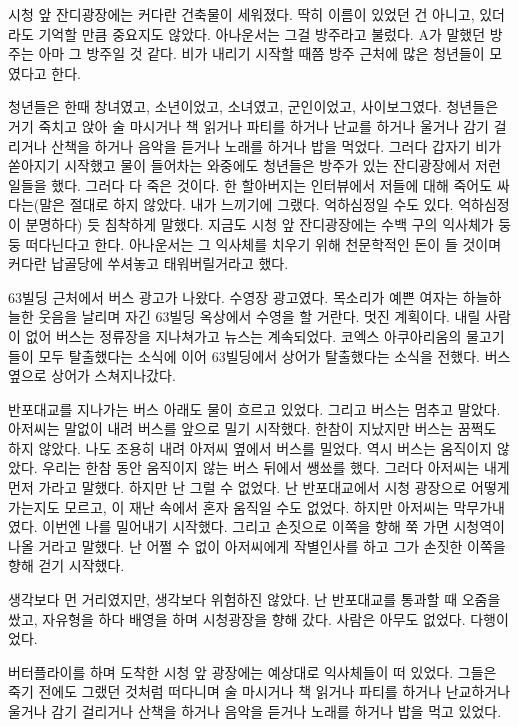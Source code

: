 \documentclass[a5paper,10pt, twoside, openright]{memoir}
\begin{document}
	시청 앞 잔디광장에는 커다란 건축물이 세워졌다. 딱히 이름이 있었던 건 아니고, 있더라도 기억할 만큼 중요지도 않았다. 아나운서는 그걸 방주라고 불렀다. A가 말했던 방주는 아마 그 방주일 것 같다. 비가 내리기 시작할 때쯤 방주 근처에 많은 청년들이 모였다고 한다. 
	
	청년들은 한때 창녀였고, 소년이었고, 소녀였고, 군인이었고, 사이보그였다. 청년들은 거기 죽치고 앉아 술 마시거나 책 읽거나 파티를 하거나 난교를 하거나 울거나 감기 걸리거나 산책을 하거나 음악을 듣거나 노래를 하거나 밥을 먹었다. 그러다 갑자기 비가 쏟아지기 시작했고 물이 들어차는 와중에도 청년들은 방주가 있는 잔디광장에서 저런 일들을 했다. 그러다 다 죽은 것이다. 한 할아버지는 인터뷰에서 저들에 대해 죽어도 싸다는(말은 절대로 하지 않았다. 내가 느끼기에 그랬다. 억하심정일 수도 있다. 억하심정이 분명하다) 듯 침착하게 말했다. 지금도 시청 앞 잔디광장에는 수백 구의 익사체가 둥둥 떠다닌다고 한다. 아나운서는 그 익사체를 치우기 위해 천문학적인 돈이 들 것이며 커다란 납골당에 쑤셔놓고 태워버릴거라고 했다. 
	
	63빌딩 근처에서 버스 광고가 나왔다. 수영장 광고였다. 목소리가 예쁜 여자는 하늘하늘한 웃음을 날리며 자긴 63빌딩 옥상에서 수영을 할 거란다. 멋진 계획이다. 내릴 사람이 없어 버스는 정류장을 지나쳐가고 뉴스는 계속되었다. 코엑스 아쿠아리움의 물고기들이 모두 탈출했다는 소식에 이어 63빌딩에서 상어가 탈출했다는 소식을 전했다. 버스 옆으로 상어가 스쳐지나갔다. 

	반포대교를 지나가는 버스 아래도 물이 흐르고 있었다. 그리고 버스는 멈추고 말았다. 아저씨는 말없이 내려 버스를 앞으로 밀기 시작했다. 한참이 지났지만 버스는 꿈쩍도 하지 않았다. 나도 조용히 내려 아저씨 옆에서 버스를 밀었다. 역시 버스는 움직이지 않았다. 우리는 한참 동안 움직이지 않는 버스 뒤에서 쌩쑈를 했다. 그러다 아저씨는 내게 먼저 가라고 말했다. 하지만 난 그럴 수 없었다. 난 반포대교에서 시청 광장으로 어떻게 가는지도 모르고, 이 재난 속에서 혼자 움직일 수도 없었다. 하지만 아저씨는 막무가내였다. 이번엔 나를 밀어내기 시작했다. 그리고 손짓으로 이쪽을 향해 쭉 가면 시청역이 나올 거라고 말했다. 난 어쩔 수 없이 아저씨에게 작별인사를 하고 그가 손짓한 이쪽을 향해 걷기 시작했다. 

	생각보다 먼 거리였지만, 생각보다 위험하진 않았다. 난 반포대교를 통과할 때 오줌을 쌌고, 자유형을 하다 배영을 하며 시청광장을 향해 갔다. 사람은 아무도 없었다. 다행이었다. 

	버터플라이를 하며 도착한 시청 앞 광장에는 예상대로 익사체들이 떠 있었다. 그들은 죽기 전에도 그랬던 것처럼 떠다니며 술 마시거나 책 읽거나 파티를 하거나 난교하거나 울거나 감기 걸리거나 산책을 하거나 음악을 듣거나 노래를 하거나 밥을 먹고 있었다. 
	
\end{document}
